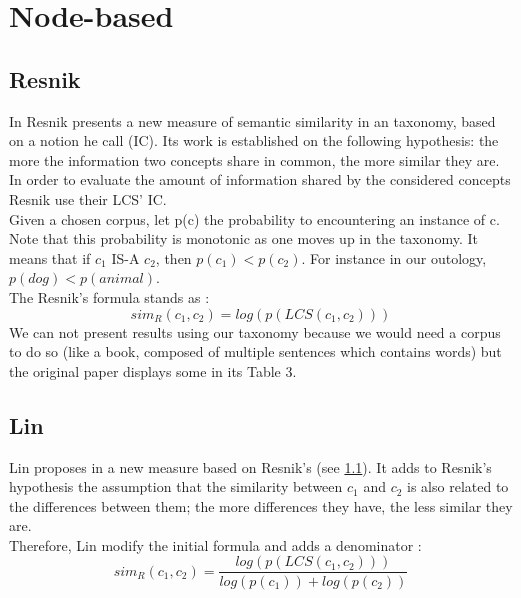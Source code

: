 
\section{Node-based}

\subsection{Resnik} %
\label{sub:resnik}
In \cite{resnik1995using} Resnik presents a new measure of semantic similarity in an  taxonomy, based on a notion he call  (IC). Its work is established on the following hypothesis: the
more the information two concepts share in common, the more similar they are. In order to evaluate the amount of information shared by the considered concepts Resnik use their LCS' IC.\\

Given a chosen corpus, let p(c) the probability to encountering an instance of c. Note that this probability is monotonic as one moves up in the taxonomy. It means that if $c_1$ IS-A $c_2$, then $p(c_1) < p(c_2)$. For instance in our outology, $p(dog) < p(animal)$.\\
The Resnik's formula stands as :
\begin{equation}
\label{eq:resnik}
sim_R(c_1, c_2) = log(p(LCS(c_1,c_2)))
\end{equation}
We can not present results using our taxonomy because we would need a corpus to do so (like a book, composed of multiple sentences which contains words) but the original paper displays some in its Table 3.

\subsection{Lin} %
\label{sub:lin}
Lin proposes in \cite{lin1998information} a new measure based on Resnik's (see \ref{sub:resnik}). It adds to Resnik's hypothesis the assumption that the similarity between $c_1$ and $c_2$ is also related to the differences between them; the more differences they have, the less similar they are.\\
Therefore, Lin modify the initial formula and adds a denominator :
\begin{equation}
\label{eq:lin}
sim_R(c_1, c_2) = \frac{log(p(LCS(c_1,c_2)))}{log(p(c_1)) + log(p(c_2))}
\end{equation}

